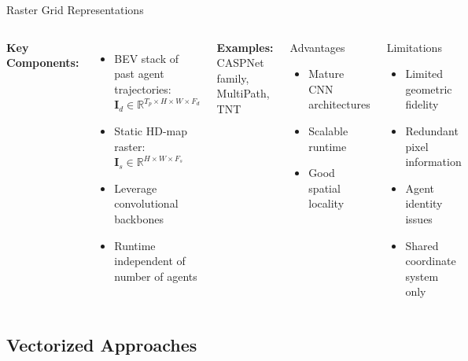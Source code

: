 \documentclass[10pt,aspectratio=169]{beamer}
\begin{document}
\begin{frame}{Raster Grid Representations}
\begin{columns}[T]
\textbf{Key Components:}
\begin{itemize}
    \item BEV stack of past agent trajectories: $\mathbf{I}_d \in \mathbb{R}^{T_p \times H \times W \times F_d}$
    \item Static HD-map raster: $\mathbf{I}_s \in \mathbb{R}^{H \times W \times F_s}$
    \item Leverage convolutional backbones
    \item Runtime independent of number of agents
\end{itemize}

\textbf{Examples:} CASPNet family, MultiPath, TNT

\begin{block}{Advantages}
\begin{itemize}
    \item Mature CNN architectures
    \item Scalable runtime
    \item Good spatial locality
\end{itemize}
\end{block}

\begin{alertblock}{Limitations}
\begin{itemize}
    \item Limited geometric fidelity
    \item Redundant pixel information
    \item Agent identity issues
    \item Shared coordinate system only
\end{itemize}
\end{alertblock}
\end{columns}
\end{frame}

\subsection{Vectorized Approaches}
\end{document}
